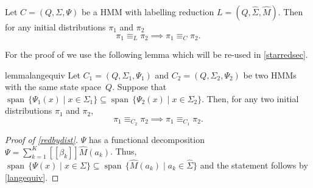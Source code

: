 \documentclass[a4paper,UKenglish,cleveref, autoref,mathscr]{lipics-v2019}
\newcommand{\1}{\mathbbm{1}}
\DeclareMathOperator{\Span}{span\,}
\begin{document}
\begin{proposition}\label{redbydist}
Let $C = (Q, \Sigma, \Psi)$ be a HMM with labelling reduction $L = (Q, \hat{\Sigma}, \hat{M})$. Then for any initial distributions $\pi_1$ and $\pi_2$
\[\pi_1 \equiv_L \pi_2 \implies \pi_1 \equiv_C \pi_2.\]
\end{proposition}
For the proof of  we use the following lemma %
which will be re-used in \cref{starredsec}.

\begin{restatable}{lemma}{langequiv}\label{langequiv}
Let $C_1 = (Q, \Sigma_1, \Psi_1)$ and $C_2 = (Q, \Sigma_2, \Psi_2)$ be two HMMs with the same state space~$Q$.
Suppose that $\Span \{\Psi_1(x) \mid x \in \Sigma_1\} \subseteq \Span \{\Psi_2(x) \mid x \in \Sigma_2\}$.
Then, for any two initial distributions $\pi_1$ and $\pi_2$,
\[\pi_1 \equiv_{C_2} \pi_2 \implies \pi_1 \equiv_{C_1} \pi_2.\]
\end{restatable}
\begin{proof}[Proof of \cref{redbydist}]
$\Psi$ has a functional decomposition $\Psi = \sum_{k = 1}^K [\![\beta_k]\!] \hat{M}(a_k)$.
Thus, $\Span \{\Psi(x) \mid x \in \Sigma\} \subseteq \Span \{\hat{M}(a_k) \mid a_k \in \hat{\Sigma}\}$
and the statement follows by \cref{langequiv}.
\end{proof}
\end{document}

